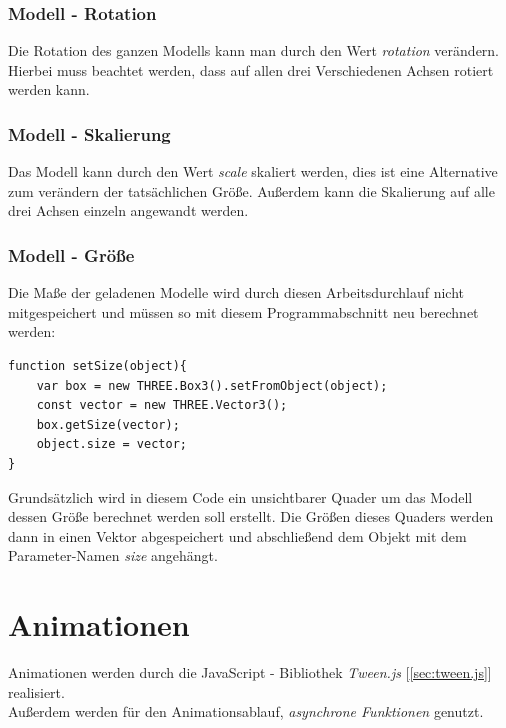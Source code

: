\subsection{Modell - Rotation}
Die Rotation des ganzen Modells kann man durch den Wert \textit{rotation} verändern. Hierbei muss beachtet werden, dass auf allen drei Verschiedenen Achsen rotiert werden kann.
\subsection{Modell - Skalierung}
Das Modell kann durch den Wert \textit{scale} skaliert werden, dies ist eine Alternative zum verändern der tatsächlichen Größe. Außerdem kann die Skalierung auf alle drei Achsen einzeln angewandt werden.
\subsection{Modell - Größe}
Die Maße der geladenen Modelle wird durch diesen Arbeitsdurchlauf nicht mitgespeichert und müssen so mit diesem Programmabschnitt neu berechnet werden:
\begin{lstlisting}
function setSize(object){
    var box = new THREE.Box3().setFromObject(object);
    const vector = new THREE.Vector3();
    box.getSize(vector);
    object.size = vector;
}
\end{lstlisting}
Grundsätzlich wird in diesem Code ein unsichtbarer Quader um das Modell dessen Größe berechnet werden soll erstellt. Die Größen dieses Quaders werden dann in einen Vektor abgespeichert und abschließend dem Objekt mit dem Parameter-Namen \textit{size} angehängt.
\newpage
\chapter{Animationen}

Animationen werden durch die JavaScript - Bibliothek \textit{Tween.js} [\ref{sec:tween.js}] realisiert. \\
Außerdem werden für den Animationsablauf, \textit{asynchrone Funktionen} genutzt.

